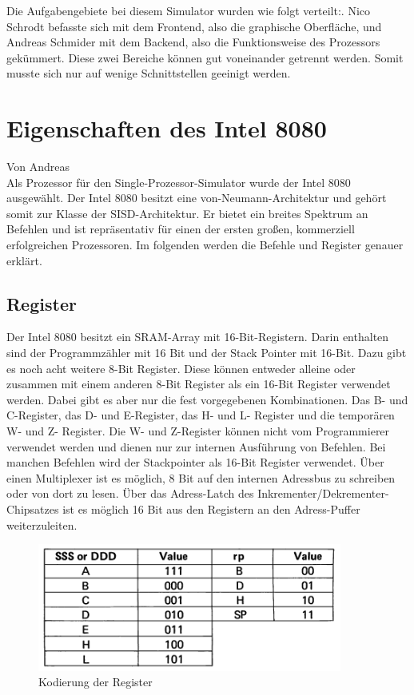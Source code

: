 \documentclass[12pt]{article}
\newcommand{\imgSpaceBefore}{\vspace{10pt}}
\begin{document}
\noindent
Die Aufgabengebiete bei diesem Simulator wurden wie folgt verteilt:. Nico Schrodt befasste sich mit dem Frontend, also die graphische Oberfläche, und Andreas Schmider mit dem Backend, also die Funktionsweise des Prozessors gekümmert. Diese zwei Bereiche können gut voneinander getrennt werden. Somit musste sich nur auf wenige Schnittstellen geeinigt werden.


\newpage

\section{Eigenschaften des Intel 8080}
\label{SPS} 
Von Andreas\\ 

\noindent
Als Prozessor für den Single-Prozessor-Simulator wurde der Intel 8080 ausgewählt. Der Intel 8080 besitzt eine von-Neumann-Architektur und gehört somit zur Klasse der SISD-Architektur. Er bietet ein breites Spektrum an Befehlen und ist repräsentativ für einen der ersten großen, kommerziell erfolgreichen Prozessoren. Im folgenden werden die Befehle und Register genauer erklärt.

\subsection{Register}
\label{RegisterSection}

Der Intel 8080 besitzt ein SRAM-Array mit 16-Bit-Registern. Darin enthalten sind der Programmzähler mit 16 Bit und der Stack Pointer mit 16-Bit. Dazu gibt es noch acht weitere 8-Bit Register. Diese können entweder alleine oder zusammen mit einem anderen 8-Bit Register als ein 16-Bit Register verwendet werden. Dabei gibt es aber nur die fest vorgegebenen Kombinationen. Das B- und C-Register, das D- und E-Register, das H- und L- Register und die temporären W- und Z- Register. Die W- und Z-Register können nicht vom Programmierer verwendet werden und dienen nur zur internen Ausführung von Befehlen. Bei manchen Befehlen wird der Stackpointer als 16-Bit Register verwendet.
Über einen Multiplexer ist es möglich, 8 Bit auf den internen Adressbus zu schreiben oder von dort zu lesen. Über das Adress-Latch des Inkrementer/Dekrementer-Chipsatzes ist es möglich 16 Bit aus den Registern an den Adress-Puffer weiterzuleiten. \cite{IntMan16}


\imgSpaceBefore
\begin{figure}[h]
\centering
\includegraphics[width=10cm]{Bilder/register_kodierung}
\caption{Kodierung der Register \cite{IntMan30}}
\label{fig:register_kodierung}
\end{figure}
\end{document}
